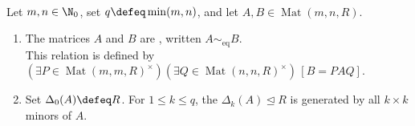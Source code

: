 \begin{definition} \label{def:pid-matrix-equivalence-and-determinantal-ideals} \\
Let $m,n\in\N_0$, set $q\defeq\min(m,n)$, and let $A,B\in\operatorname{Mat}(m,n,R)$.
\begin{enumerate}[label=(\roman*)]
\setlength{\itemsep}{0pt}
\item The matrices $A$ and $B$ are , written $A\sim_{\mathrm{eq}}B$.\\
This relation is defined by $(\exists P\in\operatorname{Mat}(m,m,R)^\times)(\exists Q\in\operatorname{Mat}(n,n,R)^\times)\,[B=PAQ]$.
\item Set $\Delta_0(A)\defeq R$. For $1\leq k\leq q$, the  $\Delta_k(A)\trianglelefteq R$ is generated by all $k\times k$ minors of $A$.
\end{enumerate}
\end{definition}

